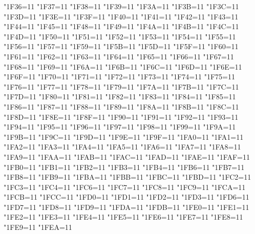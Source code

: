 \catcode"1F36=11 \catcode"1F37=11 \catcode"1F38=11 \catcode"1F39=11
\catcode"1F3A=11 \catcode"1F3B=11 \catcode"1F3C=11 \catcode"1F3D=11
\catcode"1F3E=11 \catcode"1F3F=11 \catcode"1F40=11 \catcode"1F41=11
\catcode"1F42=11 \catcode"1F43=11 \catcode"1F44=11 \catcode"1F45=11
\catcode"1F48=11 \catcode"1F49=11 \catcode"1F4A=11 \catcode"1F4B=11
\catcode"1F4C=11 \catcode"1F4D=11 \catcode"1F50=11 \catcode"1F51=11
\catcode"1F52=11 \catcode"1F53=11 \catcode"1F54=11 \catcode"1F55=11
\catcode"1F56=11 \catcode"1F57=11 \catcode"1F59=11 \catcode"1F5B=11
\catcode"1F5D=11 \catcode"1F5F=11 \catcode"1F60=11 \catcode"1F61=11
\catcode"1F62=11 \catcode"1F63=11 \catcode"1F64=11 \catcode"1F65=11
\catcode"1F66=11 \catcode"1F67=11 \catcode"1F68=11 \catcode"1F69=11
\catcode"1F6A=11 \catcode"1F6B=11 \catcode"1F6C=11 \catcode"1F6D=11
\catcode"1F6E=11 \catcode"1F6F=11 \catcode"1F70=11 \catcode"1F71=11
\catcode"1F72=11 \catcode"1F73=11 \catcode"1F74=11 \catcode"1F75=11
\catcode"1F76=11 \catcode"1F77=11 \catcode"1F78=11 \catcode"1F79=11
\catcode"1F7A=11 \catcode"1F7B=11 \catcode"1F7C=11 \catcode"1F7D=11
\catcode"1F80=11 \catcode"1F81=11 \catcode"1F82=11 \catcode"1F83=11
\catcode"1F84=11 \catcode"1F85=11 \catcode"1F86=11 \catcode"1F87=11
\catcode"1F88=11 \catcode"1F89=11 \catcode"1F8A=11 \catcode"1F8B=11
\catcode"1F8C=11 \catcode"1F8D=11 \catcode"1F8E=11 \catcode"1F8F=11
\catcode"1F90=11 \catcode"1F91=11 \catcode"1F92=11 \catcode"1F93=11
\catcode"1F94=11 \catcode"1F95=11 \catcode"1F96=11 \catcode"1F97=11
\catcode"1F98=11 \catcode"1F99=11 \catcode"1F9A=11 \catcode"1F9B=11
\catcode"1F9C=11 \catcode"1F9D=11 \catcode"1F9E=11 \catcode"1F9F=11
\catcode"1FA0=11 \catcode"1FA1=11 \catcode"1FA2=11 \catcode"1FA3=11
\catcode"1FA4=11 \catcode"1FA5=11 \catcode"1FA6=11 \catcode"1FA7=11
\catcode"1FA8=11 \catcode"1FA9=11 \catcode"1FAA=11 \catcode"1FAB=11
\catcode"1FAC=11 \catcode"1FAD=11 \catcode"1FAE=11 \catcode"1FAF=11
\catcode"1FB0=11 \catcode"1FB1=11 \catcode"1FB2=11 \catcode"1FB3=11
\catcode"1FB4=11 \catcode"1FB6=11 \catcode"1FB7=11 \catcode"1FB8=11
\catcode"1FB9=11 \catcode"1FBA=11 \catcode"1FBB=11 \catcode"1FBC=11
\catcode"1FBD=11 \catcode"1FC2=11 \catcode"1FC3=11 \catcode"1FC4=11
\catcode"1FC6=11 \catcode"1FC7=11 \catcode"1FC8=11 \catcode"1FC9=11
\catcode"1FCA=11 \catcode"1FCB=11 \catcode"1FCC=11 \catcode"1FD0=11
\catcode"1FD1=11 \catcode"1FD2=11 \catcode"1FD3=11 \catcode"1FD6=11
\catcode"1FD7=11 \catcode"1FD8=11 \catcode"1FD9=11 \catcode"1FDA=11
\catcode"1FDB=11 \catcode"1FE0=11 \catcode"1FE1=11 \catcode"1FE2=11
\catcode"1FE3=11 \catcode"1FE4=11 \catcode"1FE5=11 \catcode"1FE6=11
\catcode"1FE7=11 \catcode"1FE8=11 \catcode"1FE9=11 \catcode"1FEA=11
